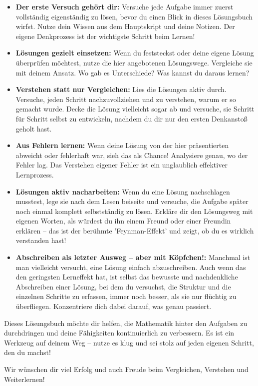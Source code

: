 \begin{itemize}
    \item \textbf{Der erste Versuch gehört dir:} Versuche jede Aufgabe immer zuerst vollständig eigenständig zu lösen, bevor du einen Blick in dieses Lösungsbuch wirfst.  Nutze dein Wissen aus dem Hauptskript und deine Notizen. Der eigene Denkprozess ist der wichtigste Schritt beim Lernen!
    \item \textbf{Lösungen gezielt einsetzen:} Wenn du feststeckst oder deine eigene Lösung überprüfen möchtest, nutze die hier angebotenen Lösungswege. Vergleiche sie mit deinem Ansatz. Wo gab es Unterschiede? Was kannst du daraus lernen?
    \item \textbf{Verstehen statt nur Vergleichen:} Lies die Lösungen aktiv durch.  Versuche, jeden Schritt nachzuvollziehen und zu verstehen, warum er so gemacht wurde.         Decke die Lösung vielleicht sogar ab und versuche, sie Schritt für Schritt selbst zu entwickeln, nachdem du dir nur den ersten Denkanstoß geholt hast.        
    \item \textbf{Aus Fehlern lernen:} Wenn deine Lösung von der hier präsentierten abweicht oder fehlerhaft war, sieh das als Chance! Analysiere genau, wo der Fehler lag. Das Verstehen eigener Fehler ist ein unglaublich effektiver Lernprozess.        
    \item \textbf{Lösungen aktiv nacharbeiten:} Wenn du eine Lösung nachschlagen musstest, lege sie nach dem Lesen beiseite und versuche, die Aufgabe später noch einmal komplett selbstständig zu lösen.         Erkläre dir den Lösungsweg mit eigenen Worten, als würdest du ihn einem Freund oder einer Freundin erklären – das ist der berühmte 'Feynman-Effekt' und zeigt, ob du es wirklich verstanden hast!        
    \item \textbf{Abschreiben als letzter Ausweg – aber mit Köpfchen!:} Manchmal ist man vielleicht versucht, eine Lösung einfach abzuschreiben. Auch wenn das den geringsten Lerneffekt hat, ist selbst das bewusste und nachdenkliche Abschreiben einer Lösung, bei dem du versuchst, die Struktur und die einzelnen Schritte zu erfassen, immer noch besser, als sie nur flüchtig zu überfliegen. Konzentriere dich dabei darauf, was genau passiert.
\end{itemize}

Dieses Lösungsbuch möchte dir helfen, die Mathematik hinter den Aufgaben zu durchdringen und deine Fähigkeiten kontinuierlich zu verbessern.       Es ist ein Werkzeug auf deinem Weg – nutze es klug und sei stolz auf jeden eigenen Schritt, den du machst!

Wir wünschen dir viel Erfolg und auch Freude beim Vergleichen, Verstehen und Weiterlernen!